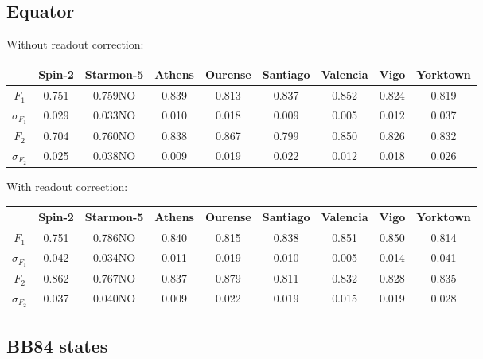 \subsection{Equator}


Without readout correction:
\begin{table}[H]
    \centering
    \begin{tabular}{|c|c|c|c|c|c|c|c|c|}
    \hline
    \textbf{} & \textbf{Spin-2} & \textbf{Starmon-5} & \textbf{Athens} & \textbf{Ourense} & \textbf{Santiago} & \textbf{Valencia} & \textbf{Vigo} & \textbf{Yorktown} \\ \hline
    $F_1$              & 0.751  & 0.759NO & 0.839 & 0.813 & 0.837 & 0.852 & 0.824 & 0.819 \\ \hline
    $\sigma_{F_1}$     & 0.029  & 0.033NO & 0.010 & 0.018 & 0.009 & 0.005 & 0.012 & 0.037 \\ \hline
    $F_2$              & 0.704  & 0.760NO & 0.838 & 0.867 & 0.799 & 0.850 & 0.826 & 0.832 \\ \hline
    $\sigma_{F_2}$     & 0.025  & 0.038NO & 0.009 & 0.019 & 0.022 & 0.012 & 0.018 & 0.026 \\ \hline
    \end{tabular}
\end{table}


With readout correction:
\begin{table}[H]
    \centering
    \begin{tabular}{|c|c|c|c|c|c|c|c|c|}
    \hline
    \textbf{} & \textbf{Spin-2} & \textbf{Starmon-5} & \textbf{Athens} & \textbf{Ourense} & \textbf{Santiago} & \textbf{Valencia} & \textbf{Vigo} & \textbf{Yorktown} \\ \hline
    $F_1$              & 0.751 & 0.786NO & 0.840 & 0.815 & 0.838 & 0.851 & 0.850 & 0.814 \\ \hline
    $\sigma_{F_1}$     & 0.042 & 0.034NO & 0.011 & 0.019 & 0.010 & 0.005 & 0.014 & 0.041 \\ \hline
    $F_2$              & 0.862 & 0.767NO & 0.837 & 0.879 & 0.811 & 0.832 & 0.828 & 0.835 \\ \hline
    $\sigma_{F_2}$     & 0.037 & 0.040NO & 0.009 & 0.022 & 0.019 & 0.015 & 0.019 & 0.028 \\ \hline
    \end{tabular}
\end{table}

\subsection{BB84 states}

